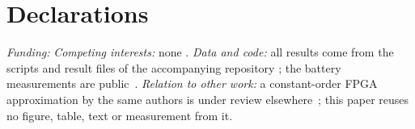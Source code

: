 \documentclass[review,12pt]{elsarticle}
\begin{document}
\section*{Declarations}
\noindent\emph{Funding:}  \emph{Competing interests:} none . \emph{Data and code:} all results come from the scripts and result files of the accompanying repository ; the battery measurements are public~\cite{kollmeyer2018data}. \emph{Relation to other work:} a constant-order FPGA approximation by the same authors is under review elsewhere~\cite{tcas_submission}; this paper reuses no figure, table, text or measurement from it.



\end{document}
